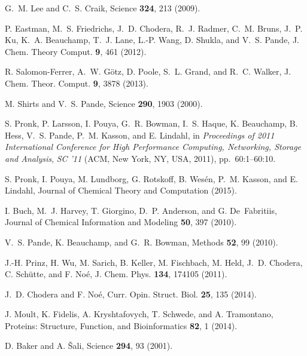 \documentclass[aps,prl,preprint,nofootinbib,superscriptaddress,linenumbers]{revtex4-1}
\begin{document}
\begin{thebibliography}{100}

G.~M. Lee and C.~S. Craik, Science {\bf 324},  213  (2009).

P. Eastman, M.~S. Friedrichs, J.~D. Chodera, R.~J. Radmer, C.~M. Bruns, J.~P.
  Ku, K.~A. Beauchamp, T.~J. Lane, L.-P. Wang, D. Shukla, and V.~S. Pande, J.
  Chem. Theory Comput. {\bf 9},  461  (2012).

R. Salomon-Ferrer, A.~W. G\"{o}tz, D. Poole, S.~L. Grand, and R.~C. Walker, J.
  Chem. Theor. Comput. {\bf 9},  3878  (2013).

M. Shirts and V.~S. Pande, Science {\bf 290},  1903  (2000).

S. Pronk, P. Larsson, I. Pouya, G.~R. Bowman, I.~S. Haque, K. Beauchamp, B.
  Hess, V.~S. Pande, P.~M. Kasson, and E. Lindahl,  in {\em Proceedings of 2011
  {International} {Conference} for {High} {Performance} {Computing},
  {Networking}, {Storage} and {Analysis}}, {\em {SC} '11} (ACM, New York, NY,
  USA, 2011), pp.\ 60:1--60:10.

S. Pronk, I. Pouya, M. Lundborg, G. Rotskoff, B. Wes\'{e}n, P.~M. Kasson, and
  E. Lindahl, Journal of Chemical Theory and Computation  (2015).

I. Buch, M.~J. Harvey, T. Giorgino, D.~P. Anderson, and G. De~Fabritiis,
  Journal of Chemical Information and Modeling {\bf 50},  397  (2010).

V.~S. Pande, K. Beauchamp, and G.~R. Bowman, Methods {\bf 52},  99  (2010).

J.-H. Prinz, H. Wu, M. Sarich, B. Keller, M. Fischbach, M. Held, J.~D. Chodera,
  C. Sch\"{u}tte, and F. No\'{e}, J. Chem. Phys. {\bf 134},  174105  (2011).

J.~D. Chodera and F. No\'{e}, Curr. Opin. Struct. Biol. {\bf 25},  135  (2014).

J. Moult, K. Fidelis, A. Kryshtafovych, T. Schwede, and A. Tramontano,
  Proteins: Structure, Function, and Bioinformatics {\bf 82},  1  (2014).

D. Baker and A. {\v{S}ali}, Science {\bf 294},  93  (2001).


\end{thebibliography}
\end{document}
